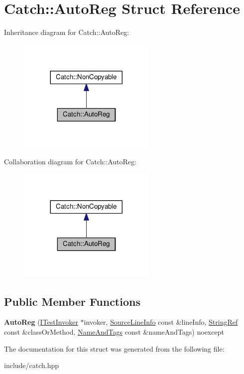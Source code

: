 \hypertarget{structCatch_1_1AutoReg}{}\section{Catch\+:\+:Auto\+Reg Struct Reference}
\label{structCatch_1_1AutoReg}


Inheritance diagram for Catch\+:\+:Auto\+Reg\+:
\nopagebreak
\begin{figure}[H]
\begin{center}
\leavevmode
\includegraphics[width=188pt]{structCatch_1_1AutoReg__inherit__graph}
\end{center}
\end{figure}


Collaboration diagram for Catch\+:\+:Auto\+Reg\+:
\nopagebreak
\begin{figure}[H]
\begin{center}
\leavevmode
\includegraphics[width=188pt]{structCatch_1_1AutoReg__coll__graph}
\end{center}
\end{figure}
\subsection*{Public Member Functions}
\begin{DoxyCompactItemize}
\item 
{\bfseries Auto\+Reg} (\hyperlink{structCatch_1_1ITestInvoker}{I\+Test\+Invoker} $\ast$invoker, \hyperlink{structCatch_1_1SourceLineInfo}{Source\+Line\+Info} const \&line\+Info, \hyperlink{classCatch_1_1StringRef}{String\+Ref} const \&class\+Or\+Method, \hyperlink{structCatch_1_1NameAndTags}{Name\+And\+Tags} const \&name\+And\+Tags) noexcept\hypertarget{structCatch_1_1AutoReg_a7eba02fb9d80b9896bf5a6517369af28}{}\label{structCatch_1_1AutoReg_a7eba02fb9d80b9896bf5a6517369af28}

\end{DoxyCompactItemize}


The documentation for this struct was generated from the following file\+:\begin{DoxyCompactItemize}
\item 
include/catch.\+hpp\end{DoxyCompactItemize}
